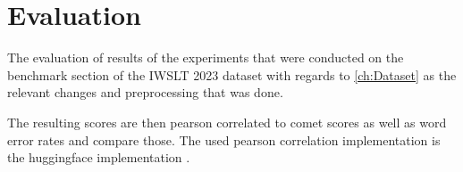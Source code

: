 
\chapter{Evaluation}
\label{ch:Evaluation}
The evaluation of results of the experiments that were conducted on the benchmark section of the IWSLT 2023 dataset \cite{sperber2024evaluating} with regards to \autoref{ch:Dataset} as the relevant changes and preprocessing that was done.

The resulting scores are then pearson correlated \cite{2020SciPy-NMeth} to comet scores as well as word error rates and compare those. The used pearson correlation implementation is the huggingface implementation \cite{huggingfacepearsonr}.

